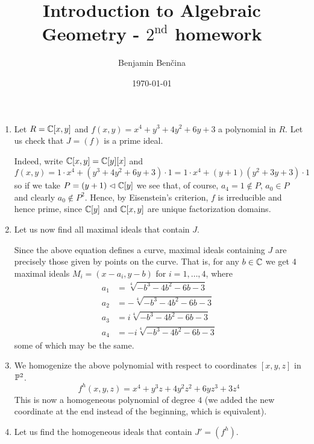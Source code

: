 \documentclass[a4paper, 12pt]{article}
\title{Introduction to Algebraic Geometry - $2^{\text{nd}}$ homework}
\author{Benjamin Benčina}
\date{\today}
\begin{document}
\maketitle

\begin{Exercise}
    \begin{enumerate}[label=(\roman*)]
        \item Let $R = \C[x,y]$ and $f(x, y) = x^4 + y^3 + 4y^2 + 6y + 3$ a polynomial in $R$.
            Let us check that $J = (f)$ is a prime ideal.
            
            Indeed, write $\C[x,y] = \C[y][x]$ and
            \[
                f(x, y) = 1 \cdot x^4 + (y^3 + 4y^2 + 6y + 3) \cdot 1
                = 1 \cdot x^4 + (y + 1)(y^2 + 3y + 3) \cdot 1
            \]
            so if we take $P = (y + 1) \subideal \C[y]$ we see that,
            of course, $a_4 = 1 \notin P$, $a_0 \in P$ and clearly $a_0 \notin P^2$.
            Hence, by Eisenstein's criterion, $f$ is irreducible and hence prime,
            since $\C[y]$ and $\C[x,y]$ are unique factorization domains.
        \item Let us now find all maximal ideals that contain $J$.

            Since the above equation defines a curve,
            maximal ideals containing $J$ are precisely those given by points on the curve.
            That is, for any $b \in \C$ we get $4$ maximal ideals $M_i = (x - a_i, y - b)$ for $i = 1,\dots,4$,
            where
            \begin{align*}
                a_1 &= \sqrt[4]{-b^3 - 4b^2 - 6b - 3} \\
                a_2 &= -\sqrt[4]{-b^3 - 4b^2 - 6b - 3} \\
                a_3 &= i\sqrt[4]{-b^3 - 4b^2 - 6b - 3} \\
                a_4 &= -i\sqrt[4]{-b^3 - 4b^2 - 6b - 3}
            \end{align*}
            some of which may be the same.
        \item We homogenize the above polynomial with respect to coordinates $[x, y, z]$ in $\P^2$.
            \[
                f^h(x, y, z) = x^4 + y^3z + 4y^2z^2 + 6yz^3 + 3z^4
            \]
            This is now a homogeneous polynomial of degree $4$ (we added the
            new coordinate at the end instead of the beginning, which is
            equivalent).
        \item Let us find the homogeneous ideals that contain $J' = (f^h)$.


\end{enumerate}
\end{Exercise}
\end{document}
